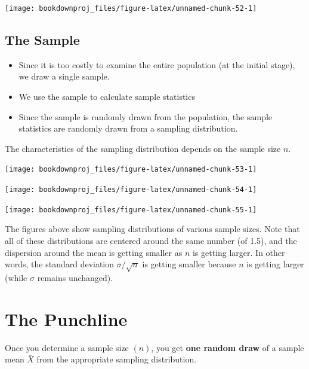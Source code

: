 \documentclass[
]{book}
\begin{document}
\begin{center}\texttt{[image: bookdownproj\_files/figure-latex/unnamed-chunk-52-1]} \end{center}

\subsection{The Sample}\label{the-sample}

\begin{itemize}
\item
  Since it is too costly to examine the entire population (at the initial stage), we draw a single sample.
\item
  We use the sample to calculate sample statistics
\item
  Since the sample is randomly drawn from the population, the sample statistics are randomly drawn from a sampling distribution.
\end{itemize}

The characteristics of the sampling distribution depends on the sample size \(n\).

\begin{center}\texttt{[image: bookdownproj\_files/figure-latex/unnamed-chunk-53-1]} \end{center}

\begin{center}\texttt{[image: bookdownproj\_files/figure-latex/unnamed-chunk-54-1]} \end{center}

\begin{center}\texttt{[image: bookdownproj\_files/figure-latex/unnamed-chunk-55-1]} \end{center}

The figures above show sampling distributions of various sample sizes. Note that all of these distributions are centered around the same number (of 1.5), and the dispersion around the mean is getting smaller as \(n\) is getting larger. In other words, the standard deviation \(\sigma / \sqrt{n}\) is getting smaller because \(n\) is getting larger (while \(\sigma\) remains unchanged).

\section{The Punchline}\label{the-punchline-1}

Once you determine a sample size \((n)\), you get \textbf{one random draw} of a sample mean \(\bar{X}\) from the appropriate sampling distribution.
\end{document}
